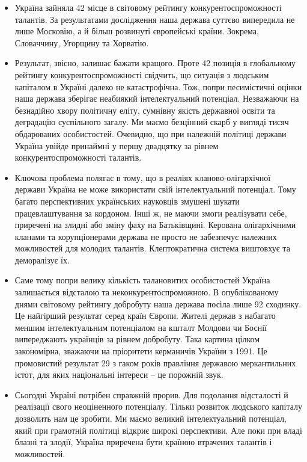 \begin{itemize}
\item Україна зайняла 42 місце в світовому рейтингу конкурентоспроможності
				талантів. За результатами дослідження наша держава суттєво випередила
				не лише Московію, а й більш розвинуті європейські країни. Зокрема,
				Словаччину, Угорщину та Хорватію.  

\item Результат, звісно, залишає бажати кращого. Проте 42 позиція в глобальному
				рейтингу конкурентоспроможності свідчить, що ситуація з людським
				капіталом в Україні далеко не катастрофічна. Тож, попри песимістичні
				оцінки наша держава зберігає неабиякий інтелектуальний потенціал.
				Незважаючи на безнадійно хвору політичну еліту, сумнівну якість
				державної освіти та деградацію суспільного загалу. Ми маємо безцінний
				скарб у вигляді тисяч обдарованих особистостей. Очевидно, що при
				належній політиці держави Україна  увійде принаймні у першу двадцятку
				за рівнем конкурентоспроможності талантів.

\item Ключова проблема полягає в тому, що в реаліях кланово-олігархічної
				держави Україна не може використати свій інтелектуальний потенціал.
				Тому багато перспективних  українських науковців змушені шукати
				працевлаштування за кордоном. Інші ж, не маючи змоги реалізувати себе,
				приречені на злидні або зміну фаху на Батьківщині. Керована
				олігархічними кланами та корупціонерами держава не просто не забезпечує
				належних можливостей для молодих талантів. Клептократична система
				виштовхує та деморалізує їх.

\item Саме тому попри велику кількість талановитих особистостей Україна
				залишається відсталою та неконкурентоспроможною. В опублікованому днями
				світовому рейтингу добробуту наша держава посіла лише 92 сходинку. Це
				найгірший результат серед країн Європи. Жителі держав з набагато меншим
				інтелектуальним потенціалом на кшталт Молдови чи Боснії випереджають
				українців за рівнем добробуту. Така картина цілком закономірна,
				зважаючи на пріоритети керманичів України з 1991. Це промовистий
				результат 29 з гаком років правління державою меркантильних істот, для
				яких національні інтереси – це порожній звук. 

\item Сьогодні Україні потрібен справжній прорив. Для подолання відсталості й
				реалізації свого неоціненного потенціалу. Тільки розвиток людського
				капіталу дозволить нам це зробити. Ми маємо великий інтелектуальний
				потенціал, який при грамотній політиці відкриє широкі перспективи. Але
				поки при владі блазні та злодії, Україна приречена бути країною
				втрачених талантів і можливостей.
\end{itemize}
